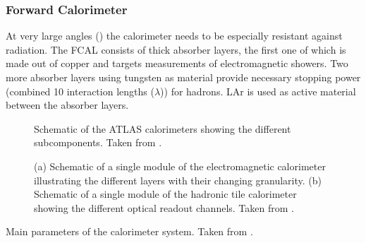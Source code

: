 \subsubsection{Forward Calorimeter}
At very large angles () the calorimeter needs to be especially resistant against radiation. The FCAL consists of thick absorber layers, the first one of which is made out of copper and targets measurements of electromagnetic showers. Two more absorber layers using tungsten as material provide necessary stopping power (combined 10 interaction lengths ($\lambda$)) for hadrons. LAr is used as active material between the absorber layers.




\begin{figure}
    \caption[Schematic of the ATLAS calorimeters showing the different subcomponents.]{Schematic of the ATLAS calorimeters showing the different subcomponents. Taken from .}
    \label{fig:ATLAScalorimeters}
\end{figure}

\begin{figure}
    \caption{(a) Schematic of a single module of the electromagnetic calorimeter illustrating the different layers with their changing granularity. (b) Schematic of a single module of the hadronic tile calorimeter showing the different optical readout channels. Taken from .}
    \label{fig:ATLASmodules}
\end{figure}

\begin{table}
    \caption{Main parameters of the calorimeter system. Taken from .}
    \label{tab:ATLAScalorimeter-parameters}
\end{table}


